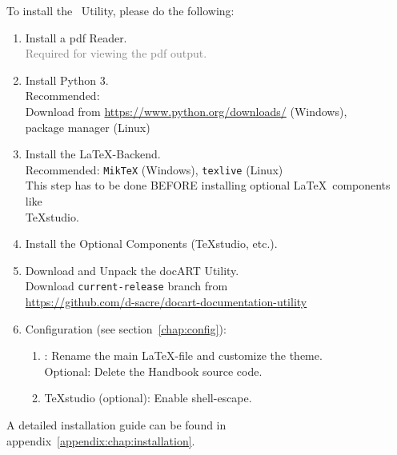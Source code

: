 	To install the \productName~Utility, please do the following:\\
	\begin{enumerate}[label={\textcolor{docartTurquoise}{Step \arabic*:}},leftmargin=*]
		\setlength\itemsep{-0.2em}
		\item Install a pdf Reader.\\
			  \textcolor{gray}{Required for viewing the pdf output.}
		\item Install Python 3.\\
			\color{gray}
			Recommended: \\
			Download from \href{https://www.python.org/downloads/}{https://www.python.org/downloads/} (Windows),\\
			package manager (Linux)
			\normalcolor
		\item Install the \LaTeX-Backend.\\
			  \color{gray} Recommended: \lstinline$MikTeX$ (Windows), \lstinline$texlive$ (Linux)\\
			  This step has to be done BEFORE installing optional \LaTeX~components like\\ TeXstudio. \normalcolor
		\item Install the Optional Components (TeXstudio, etc.).
		\item Download and Unpack the docART Utility.\\
		\color{gray}
			Download \lstinline$current-release$ branch from\\
			\href{https://github.com/d-sacre/docart-documentation-utility}{https://github.com/d-sacre/docart-documentation-utility}
		\normalcolor
		\item Configuration (see \mbox{section \ref{chap:config}}): 
		\begin{enumerate}[label={\textcolor{docartTurquoise}{Step 6.\arabic*:}},leftmargin=*]
			\item \productName: Rename the main \LaTeX-file and customize the theme.\\ 
			Optional: Delete the Handbook source code.
			\item TeXstudio (optional): Enable shell-escape.
		\end{enumerate}
	\end{enumerate}
	\vspace{0.5cm}
	A detailed installation guide can be found in \mbox{appendix \ref{appendix:chap:installation}}.